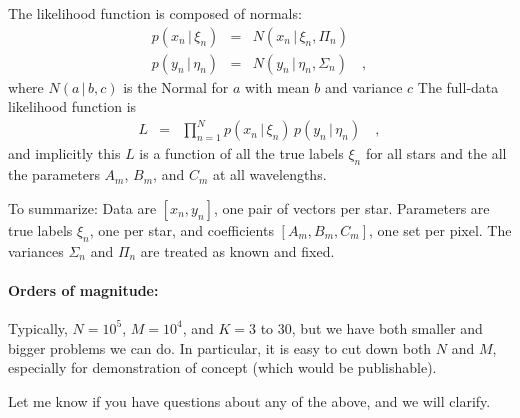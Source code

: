 \documentclass[12pt, letterpaper]{article}
\newcommand{\given}{\,|\,}
\begin{document}
The likelihood function is composed of normals:
\begin{eqnarray}
  p(x_n\given\xi_n) &=& N(x_n\given \xi_n, \Pi_n)
  \\
  p(y_n\given\eta_n) &=& N(y_n\given \eta_n, \Sigma_n)
\quad ,
\end{eqnarray}
where $N(a\given b, c)$ is the Normal for $a$ with mean $b$ and
variance $c$
The full-data likelihood function is
\begin{eqnarray}
  L &=& \prod_{n=1}^N p(x_n\given\xi_n)\,p(y_n\given\eta_n)
\quad ,
\end{eqnarray}
and implicitly this $L$ is a function of all the true labels $\xi_n$ for
all stars and the all the parameters $A_m$, $B_m$, and $C_m$ at all
wavelengths.

To summarize: Data are $[x_n, y_n]$, one pair of vectors per star.
Parameters are true labels $\xi_n$, one per star, and
coefficients $[A_m, B_m, C_m]$, one set per pixel.
The variances $\Sigma_n$ and $\Pi_n$ are treated as known and fixed.

\paragraph{Orders of magnitude:}
Typically, $N=10^5$, $M=10^4$, and $K=3$ to $30$, but we have both
smaller and bigger problems we can do. In particular, it is easy to
cut down both $N$ and $M$, especially for demonstration of concept
(which would be publishable).

Let me know if you have questions about any of the above, and we will
clarify.
\end{document}
